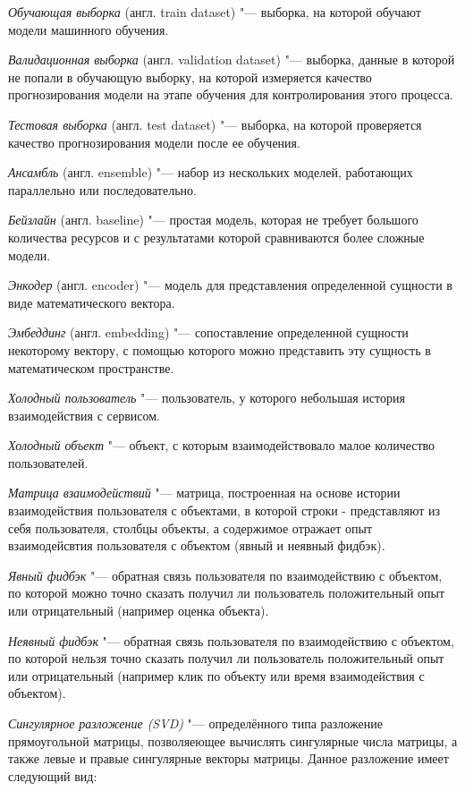 \documentclass[bachelor, och, coursework]{SCWorks}
\begin{document}
\textit{Обучающая выборка} (англ. train dataset) "--- выборка, на которой обучают модели машинного обучения.

\textit{Валидационная выборка} (англ. validation dataset) "--- выборка, данные в которой не попали в обучающую выборку,
на которой измеряется качество прогнозирования модели на этапе обучения для контролирования этого процесса.

\textit{Тестовая выборка} (англ. test dataset) "--- выборка, на которой проверяется качество прогнозирования модели
после ее обучения.

\textit{Ансамбль}  (англ. ensemble) "--- набор из нескольких моделей, работающих параллельно или последовательно.

\textit{Бейзлайн} (англ. baseline) "--- простая модель, которая не требует большого количества ресурсов и с
результатами которой сравниваются более сложные модели.

\textit{Энкодер} (англ. encoder) "--- модель для представления определенной сущности в виде математического вектора.

\textit{Эмбеддинг} (англ. embedding) "--- сопоставление определенной сущности некоторому вектору, с помощью которого
можно представить эту сущность в математическом пространстве.

\textit{Холодный пользователь} "--- пользователь, у которого небольшая история взаимодействия
с сервисом.

\textit{Холодный объект} "--- объект, с которым взаимодействовало малое количество пользователей.

\textit{Матрица взаимодействий} "--- матрица, построенная на основе истории взаимодействия пользователя с
объектами, в которой строки - представляют из себя пользователя, столбцы объекты, а содержимое отражает
опыт взаимодейсвтия пользователя с объектом (явный и неявный фидбэк).

\textit{Явный фидбэк} "--- обратная связь пользователя по взаимодействию с объектом, по которой можно точно
сказать получил ли пользователь положительный опыт или отрицательный (например оценка объекта).

\textit{Неявный фидбэк} "--- обратная связь пользователя по взаимодействию с объектом, по которой нельзя точно
сказать получил ли пользователь положительный опыт или отрицательный (например клик по объекту или время взаимодействия
с объектом).

\textit{Сингулярное разложение (SVD)} "--- определённого типа разложение прямоугольной матрицы,
позволяеющее вычислять сингулярные числа матрицы, а также левые и правые сингулярные векторы матрицы.
Данное разложение имеет следующий вид:
\end{document}
